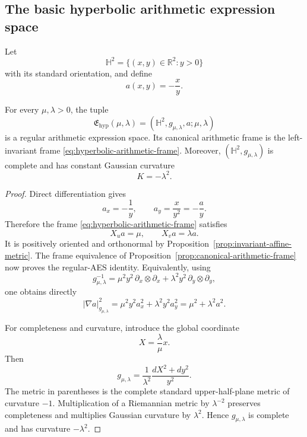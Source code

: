 \subsection{The basic hyperbolic arithmetic expression space}

Let
\[
 \mathbb H^2=\{(x,y)\in\mathbb R^2:y>0\}
\]
with its standard orientation, and define
\begin{equation}\label{eq:basic-hyperbolic-assignment}
 a(x,y)=-\frac{x}{y}.
\end{equation}

\begin{theorem}\label{thm:basic-hyperbolic-aes}
For every \(\mu,\lambda>0\), the tuple
\[
 \mathfrak E_{\mathrm{hyp}}(\mu,\lambda)
 =(\mathbb H^2,g_{\mu,\lambda},a;\mu,\lambda)
\]
is a regular arithmetic expression space.  Its canonical arithmetic frame is
the left-invariant frame \eqref{eq:hyperbolic-arithmetic-frame}.  Moreover,
\((\mathbb H^2,g_{\mu,\lambda})\) is complete and has constant Gaussian
curvature
\[
 K=-\lambda^2.
\]
\end{theorem}

\begin{proof}
Direct differentiation gives
\[
 a_x=-\frac1y,
 \qquad
 a_y=\frac{x}{y^2}=-\frac ay.
\]
Therefore the frame \eqref{eq:hyperbolic-arithmetic-frame} satisfies
\[
 X_u a=\mu,
 \qquad
 X_v a=\lambda a.
\]
It is positively oriented and orthonormal by
Proposition~\ref{prop:invariant-affine-metric}.  The frame equivalence of
Proposition~\ref{prop:canonical-arithmetic-frame} now proves the regular-AES
identity.  Equivalently, using
\[
 g_{\mu,\lambda}^{-1}
 =\mu^2y^2\,\partial_x\otimes\partial_x
  +\lambda^2y^2\,\partial_y\otimes\partial_y,
\]
one obtains directly
\[
 |\nabla a|_{g_{\mu,\lambda}}^2
 =\mu^2y^2a_x^2+\lambda^2y^2a_y^2
 =\mu^2+\lambda^2a^2.
\]

For completeness and curvature, introduce the global coordinate
\[
 X=\frac{\lambda}{\mu}x.
\]
Then
\begin{equation}\label{eq:scaled-standard-hyperbolic-metric}
 g_{\mu,\lambda}
 =\frac1{\lambda^2}\frac{dX^2+dy^2}{y^2}.
\end{equation}
The metric in parentheses is the complete standard upper-half-plane metric of
curvature \(-1\).  Multiplication of a Riemannian metric by
\(\lambda^{-2}\) preserves completeness and multiplies Gaussian curvature by
\(\lambda^2\).  Hence \(g_{\mu,\lambda}\) is complete and has curvature
\(-\lambda^2\).
\end{proof}

